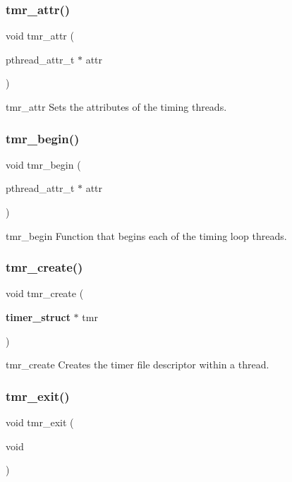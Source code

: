 \subsubsection{tmr\+\_\+attr()}
{\footnotesize\ttfamily void tmr\+\_\+attr (\begin{DoxyParamCaption}\item[{pthread\+\_\+attr\+\_\+t $\ast$}]{attr }\end{DoxyParamCaption})}

tmr\+\_\+attr Sets the attributes of the timing threads. \mbox{\label{timer_8h_a4efd332e3afdcac5e4bb91be460ff510}} 
\subsubsection{tmr\+\_\+begin()}
{\footnotesize\ttfamily void tmr\+\_\+begin (\begin{DoxyParamCaption}\item[{pthread\+\_\+attr\+\_\+t $\ast$}]{attr }\end{DoxyParamCaption})}

tmr\+\_\+begin Function that begins each of the timing loop threads. \mbox{\label{timer_8h_a30ed299558ee3d16ca6e93fa84320427}} 
\subsubsection{tmr\+\_\+create()}
{\footnotesize\ttfamily void tmr\+\_\+create (\begin{DoxyParamCaption}\item[{\textbf{ timer\+\_\+struct} $\ast$}]{tmr }\end{DoxyParamCaption})}

tmr\+\_\+create Creates the timer file descriptor within a thread. \mbox{\label{timer_8h_a05acd3f7d242aaaeadba6bba4dbaad64}} 
\subsubsection{tmr\+\_\+exit()}
{\footnotesize\ttfamily void tmr\+\_\+exit (\begin{DoxyParamCaption}\item[{void}]{ }\end{DoxyParamCaption})}

